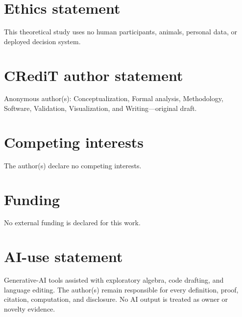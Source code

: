\documentclass[a4paper,10pt]{amsart}
\theoremstyle{remark}
\begin{document}
\section*{Ethics statement}
This theoretical study uses no human participants, animals, personal data,
or deployed decision system.

\section*{CRediT author statement}
Anonymous author(s): Conceptualization, Formal analysis, Methodology,
Software, Validation, Visualization, and Writing---original draft.

\section*{Competing interests}
The author(s) declare no competing interests.

\section*{Funding}
No external funding is declared for this work.

\section*{AI-use statement}
Generative-AI tools assisted with exploratory algebra, code drafting, and
language editing.  The author(s) remain responsible for every definition,
proof, citation, computation, and disclosure.  No AI output is treated as
owner or novelty evidence.



\end{document}
